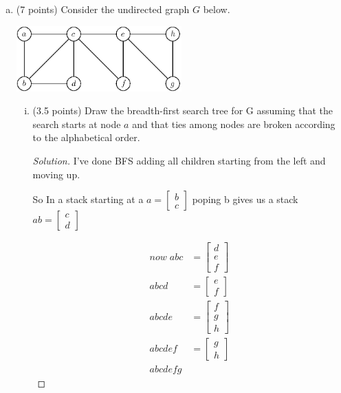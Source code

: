 \documentclass[12pt]{amsart}
\begin{document}
\begin{enumerate}[(a)]
\item (7 points)
Consider the undirected graph $G$ below.

\smallskip
\begin{center}
\includegraphics[width=0.5\textwidth]{fig_2a.eps}
\end{center}

\smallskip
\begin{enumerate}[(i)]
\item (3.5 points)
Draw the breadth-first search tree for G assuming that the search starts at node $a$ and that ties among nodes are broken according to the alphabetical order.


\begin{proof}[Solution]
I've done BFS adding all children starting from the left and moving up.
 
So In a stack starting at a 
$
a = \begin{bmatrix}
b\\c
\end{bmatrix}
$
poping b gives us a stack 
$
ab = \begin{bmatrix}
c\\d
\end{bmatrix}
$

 \begin{align*}
now \; abc &= \begin{bmatrix}
d\\e\\f
\end{bmatrix}\\
abcd &= \begin{bmatrix}
e\\f
\end{bmatrix}\\
abcde &= \begin{bmatrix}
f\\g\\h
\end{bmatrix}\\
abcdef &= \begin{bmatrix}
g\\h
\end{bmatrix}\\
abcdefg
\end{align*}



\end{proof}
\end{enumerate}
\end{enumerate}
\end{document}
